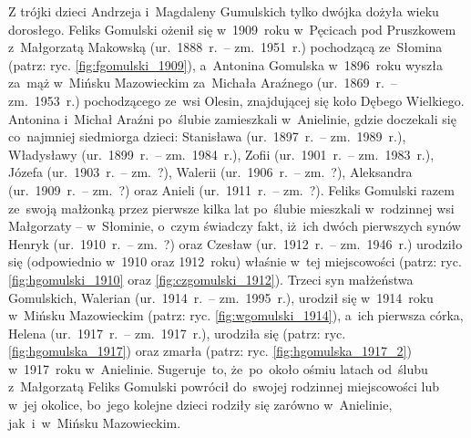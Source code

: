 Z trójki dzieci Andrzeja i~Magdaleny Gumulskich tylko dwójka dożyła wieku 
dorosłego. Feliks Gomulski
ożenił się w~1909~roku w~Pęcicach pod Pruszkowem z~Małgorzatą
Makowską
(ur.~1888~r.~-- zm.~1951~r.) pochodzącą ze~Słomina (patrz: ryc.
\ref{fig:fgomulski_1909}), a~Antonina
Gomulska w~1896~roku
wyszła za~mąż w~Mińsku Mazowieckim za~Michała
Araźnego (ur.~1869~r.~--
zm.~1953~r.) pochodzącego ze~wsi Olesin, znajdującej się koło Dębego Wielkiego.
Antonina i~Michał Araźni po~ślubie zamieszkali w~Anielinie, gdzie doczekali
się co~najmniej siedmiorga dzieci:
Stanisława (ur.~1897~r.~--
zm.~1989~r.),
Władysławy
(ur.~1899~r.~-- zm.~1984~r.),
Zofii (ur.~1901~r.~--
zm.~1983~r.), Józefa (ur.~1903~r.~--
zm.~?), Walerii (ur.~1906~r.~--
zm.~?), Aleksandra
(ur.~1909~r.~-- zm.~?) oraz
Anieli (ur.~1911~r.~-- zm.~?). 
Feliks Gomulski razem ze~swoją
małżonką przez pierwsze kilka lat po~ślubie mieszkali w~rodzinnej wsi
Małgorzaty --
w~Słominie, o~czym świadczy fakt, iż~ich dwóch pierwszych synów
Henryk (ur.~1910~r.~-- zm.~?) oraz
Czesław (ur.~1912~r.~--
zm.~1946~r.) urodziło się (odpowiednio w~1910 oraz 1912~roku) właśnie w~tej
miejscowości (patrz: ryc. \ref{fig:hgomulski_1910} oraz
\ref{fig:czgomulski_1912}). Trzeci syn małżeństwa Gomulskich,
Walerian
(ur.~1914~r.~-- zm.~1995~r.), urodził się w~1914~roku w~Mińsku Mazowieckim
(patrz: ryc. \ref{fig:wgomulski_1914}), a~ich pierwsza córka,
Helena (ur.~1917~r.~--
zm.~1917~r.), urodziła się (patrz: ryc. \ref{fig:hgomulska_1917}) oraz zmarła
(patrz: ryc. \ref{fig:hgomulska_1917_2}) w~1917~roku w~Anielinie. Sugeruje~to,
że~po~około ośmiu latach od~ślubu z~Małgorzatą Feliks Gomulski powrócił
do~swojej rodzinnej miejscowości lub w~jej okolice, bo~jego kolejne dzieci
rodziły się zarówno w~Anielinie, jak~i~w~Mińsku Mazowieckim.

